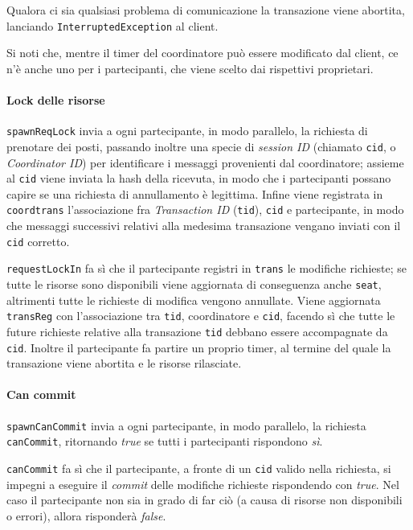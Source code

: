 \documentclass[a4paper]{article}
\begin{document}
Qualora ci sia qualsiasi problema di comunicazione la transazione viene abortita, lanciando \texttt{InterruptedException} al client. 

Si noti che, mentre il timer del coordinatore può essere modificato dal client, ce n'è anche uno per i partecipanti, che viene scelto dai rispettivi proprietari.

\paragraph{Lock delle risorse}\texttt{spawnReqLock} invia a ogni partecipante, in modo parallelo, la richiesta di prenotare dei posti, passando inoltre una specie di \textit{session ID} (chiamato \texttt{cid}, o \textit{Coordinator ID}) per identificare i messaggi provenienti dal coordinatore; %
assieme al \texttt{cid} viene inviata la hash della ricevuta, in modo che i partecipanti possano capire se una richiesta di annullamento è legittima. %
Infine viene registrata in \texttt{coordtrans} l'associazione fra \textit{Transaction ID} (\texttt{tid}), \texttt{cid} e partecipante, in modo che messaggi successivi relativi alla medesima transazione vengano inviati con il \texttt{cid} corretto.

\texttt{requestLockIn} fa sì che il partecipante registri in \texttt{trans} le modifiche richieste; se tutte le risorse sono disponibili viene aggiornata di conseguenza anche \texttt{seat}, altrimenti tutte le richieste di modifica vengono annullate. Viene aggiornata \texttt{transReg} con l'associazione tra \texttt{tid}, coordinatore e \texttt{cid}, facendo sì che tutte le future richieste relative alla transazione \texttt{tid} debbano essere accompagnate da \texttt{cid}.
Inoltre il partecipante fa partire un proprio timer, al termine del quale la transazione viene abortita e le risorse rilasciate.

\paragraph{Can commit}\texttt{spawnCanCommit} invia a ogni partecipante, in modo parallelo, la richiesta \texttt{canCommit}, ritornando \textit{true} se tutti i partecipanti rispondono \textit{sì}.

\texttt{canCommit} fa sì che il partecipante, a fronte di un \texttt{cid} valido nella richiesta, si impegni a eseguire il \textit{commit} delle modifiche richieste rispondendo con \textit{true}. Nel caso il partecipante non sia in grado di far ciò (a causa di risorse non disponibili o errori), allora risponderà \textit{false}.
\end{document}
